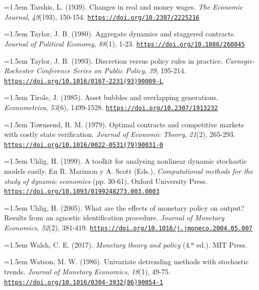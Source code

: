 \documentclass[10pt,a4paper]{article}
\begin{document}
\noindent\hangindent=1.5em Tarshis, L. (1939). Changes in real and money wages. \textit{The Economic Journal}, \textit{49}(193), 150-154. \href{https://doi.org/10.2307/2225216}{\nolinkurl{https://doi.org/10.2307/2225216}}

\noindent\hangindent=1.5em Taylor, J. B. (1980). Aggregate dynamics and staggered contracts. \textit{Journal of Political Economy}, \textit{88}(1), 1-23. \href{https://doi.org/10.1086/260845}{\nolinkurl{https://doi.org/10.1086/260845}}

\noindent\hangindent=1.5em Taylor, J. B. (1993). Discretion versus policy rules in practice. \textit{Carnegie-Rochester Conference Series on Public Policy}, \textit{39}, 195-214. \href{https://doi.org/10.1016/0167-2231(93)90009-L}{\nolinkurl{https://doi.org/10.1016/0167-2231(93)90009-L}}

\noindent\hangindent=1.5em Tirole, J. (1985). Asset bubbles and overlapping generations. \textit{Econometrica}, \textit{53}(6), 1499-1528. \href{https://doi.org/10.2307/1913232}{\nolinkurl{https://doi.org/10.2307/1913232}}

{\sloppy\noindent\hangindent=1.5em Townsend, R. M. (1979). Optimal contracts and competitive markets with costly state verification. \textit{Journal of Economic Theory}, \textit{21}(2), 265-293. \href{https://doi.org/10.1016/0022-0531(79)90031-0}{\nolinkurl{https://doi.org/10.1016/0022-0531(79)90031-0}}\par}

\noindent\hangindent=1.5em Uhlig, H. (1999). A toolkit for analysing nonlinear dynamic stochastic models easily. En R. Marimon y A. Scott (Eds.), \textit{Computational methods for the study of dynamic economies} (pp. 30-61). Oxford University Press. \href{https://doi.org/10.1093/0199248273.003.0003}{\nolinkurl{https://doi.org/10.1093/0199248273.003.0003}}

\noindent\hangindent=1.5em Uhlig, H. (2005). What are the effects of monetary policy on output? Results from an agnostic identification procedure. \textit{Journal of Monetary Economics}, \textit{52}(2), 381-419. \href{https://doi.org/10.1016/j.jmoneco.2004.05.007}{\nolinkurl{https://doi.org/10.1016/j.jmoneco.2004.05.007}}

\noindent\hangindent=1.5em Walsh, C. E. (2017). \textit{Monetary theory and policy} (4.ª ed.). MIT Press.

\noindent\hangindent=1.5em Watson, M. W. (1986). Univariate detrending methods with stochastic trends. \textit{Journal of Monetary Economics}, \textit{18}(1), 49-75. \href{https://doi.org/10.1016/0304-3932(86)90054-1}{\nolinkurl{https://doi.org/10.1016/0304-3932(86)90054-1}}
\end{document}

